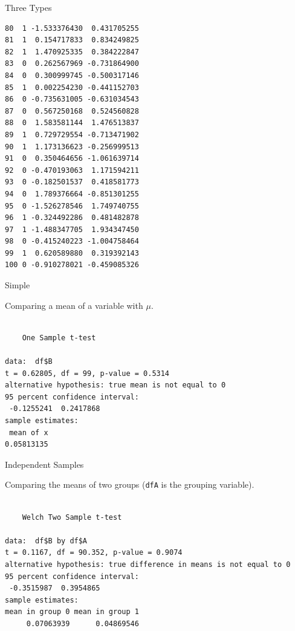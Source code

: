 \begin{frame}[fragile]{Three Types}
\begin{verbatim}
80  1 -1.533376430  0.431705255
81  1  0.154717833  0.834249825
82  1  1.470925335  0.384222847
83  0  0.262567969 -0.731864900
84  0  0.300999745 -0.500317146
85  1  0.002254230 -0.441152703
86  0 -0.735631005 -0.631034543
87  0  0.567250168  0.524560828
88  0  1.583581144  1.476513837
89  1  0.729729554 -0.713471902
90  1  1.173136623 -0.256999513
91  0  0.350464656 -1.061639714
92  0 -0.470193063  1.171594211
93  0 -0.182501537  0.418581773
94  0  1.789376664 -0.851301255
95  0 -1.526278546  1.749740755
96  1 -0.324492286  0.481482878
97  1 -1.488347705  1.934347450
98  0 -0.415240223 -1.004758464
99  1  0.620589880  0.319392143
100 0 -0.910278021 -0.459085326
\end{verbatim}

\end{frame}

\begin{frame}[fragile]{Simple}

\center
Comparing a mean of a variable with \(\mu\).

\begin{Shaded}
\begin{Highlighting}[]
\OperatorTok{$} \NormalTok{)}
\end{Highlighting}
\end{Shaded}

\begin{verbatim}

    One Sample t-test

data:  df$B
t = 0.62805, df = 99, p-value = 0.5314
alternative hypothesis: true mean is not equal to 0
95 percent confidence interval:
 -0.1255241  0.2417868
sample estimates:
 mean of x 
0.05813135 
\end{verbatim}

\end{frame}

\begin{frame}[fragile]{Independent Samples}

\center
Comparing the means of two groups (\texttt{dfA} is the grouping
variable).

\begin{Shaded}
\begin{Highlighting}[]
\OperatorTok{$}\OperatorTok{~}\StringTok{ }\OperatorTok{$}
\end{Highlighting}
\end{Shaded}

\begin{verbatim}

    Welch Two Sample t-test

data:  df$B by df$A
t = 0.1167, df = 90.352, p-value = 0.9074
alternative hypothesis: true difference in means is not equal to 0
95 percent confidence interval:
 -0.3515987  0.3954865
sample estimates:
mean in group 0 mean in group 1 
     0.07063939      0.04869546 
\end{verbatim}

\end{frame}

